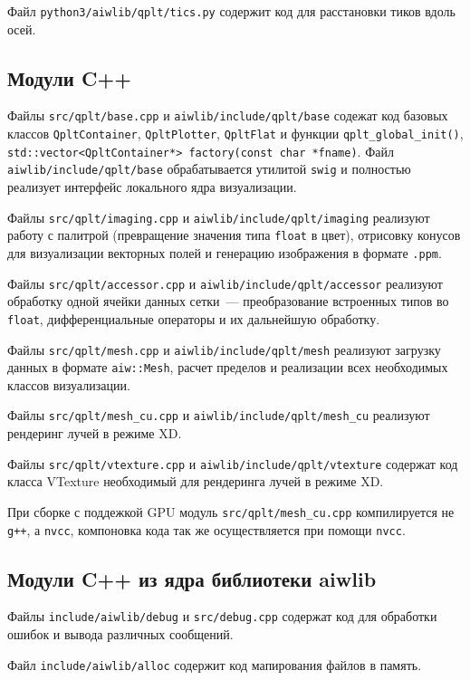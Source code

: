 \documentclass[12pt]{article}
\begin{document}
\begin{enumrate}
Файл \verb'python3/aiwlib/qplt/tics.py' содержит код для расстановки тиков вдоль осей.

\subsection{Модули C++}

Файлы \verb'src/qplt/base.cpp' и \verb'aiwlib/include/qplt/base' содежат код базовых классов \verb'QpltContainer',
\verb'QpltPlotter', \verb'QpltFlat' и функции \verb'qplt_global_init()', \verb'std::vector<QpltContainer*> factory(const char *fname)'.
Файл \verb'aiwlib/include/qplt/base' обрабатывается утилитой \verb'swig' и полностью реализует интерфейс локального ядра визуализации. 

Файлы \verb'src/qplt/imaging.cpp' и \verb'aiwlib/include/qplt/imaging' реализуют работу с палитрой (превращение значения типа \verb'float' в цвет),
отрисовку конусов для визуализации векторных полей и генерацию изображения в формате \verb'.ppm'.

Файлы \verb'src/qplt/accessor.cpp' и \verb'aiwlib/include/qplt/accessor' реализуют обработку одной ячейки данных сетки~--- преобразование
встроенных типов во \verb'float', дифференциальные операторы и их дальнейшую обработку. 

Файлы \verb'src/qplt/mesh.cpp' и \verb'aiwlib/include/qplt/mesh' реализуют загрузку данных в формате \verb'aiw::Mesh',
расчет пределов и реализации всех необходимых классов визуализации. 

Файлы \verb'src/qplt/mesh_cu.cpp' и \verb'aiwlib/include/qplt/mesh_cu' реализуют рендеринг лучей в режиме XD.

Файлы \verb'src/qplt/vtexture.cpp' и \verb'aiwlib/include/qplt/vtexture' содержат код класса VTexture необходимый для рендеринга лучей в режиме XD.

При сборке с поддежкой GPU модуль \verb'src/qplt/mesh_cu.cpp' компилируется не \verb'g++', а \verb'nvcc', компоновка кода так же осуществляется
при помощи \verb'nvcc'. 

\subsection{Модули C++ из ядра библиотеки aiwlib}
Файлы \verb'include/aiwlib/debug' и \verb'src/debug.cpp' содержат код для обработки ошибок и вывода различных сообщений.

Файл \verb'include/aiwlib/alloc' содержит код мапирования файлов в память.


\end{enumrate}
\end{document}
